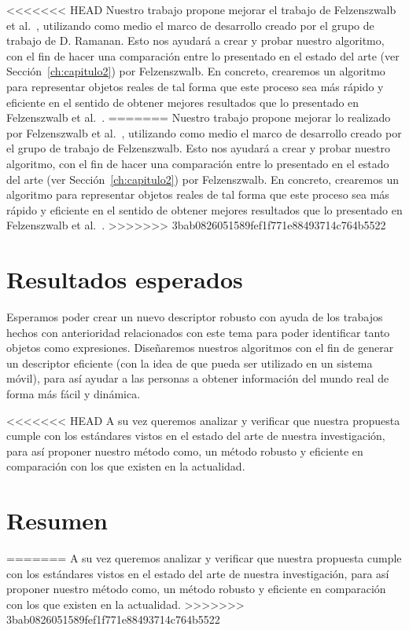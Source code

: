 <<<<<<< HEAD
Nuestro trabajo propone mejorar el trabajo de Felzenszwalb et al.~\cite{Felzenszwalb2010}, utilizando como medio el marco de desarrollo creado por el grupo de trabajo de D. Ramanan. Esto nos ayudará a crear y probar nuestro algoritmo, con el fin de hacer una comparación entre lo presentado en el estado del arte (ver Sección~\ref{ch:capitulo2}) por Felzenszwalb. En concreto, crearemos un algoritmo para representar objetos reales de tal forma que este proceso sea más rápido y eficiente en el sentido de obtener mejores resultados que lo presentado en Felzenszwalb et al.~\cite{Felzenszwalb2010}.
=======
Nuestro trabajo propone mejorar lo realizado por Felzenszwalb et al.~\cite{Felzenszwalb2010}, utilizando como medio el marco de desarrollo creado por el grupo de trabajo de Felzenszwalb. Esto nos ayudará a crear y probar nuestro algoritmo, con el fin de hacer una comparación entre lo presentado en el estado del arte (ver Sección~\ref{ch:capitulo2}) por Felzenszwalb. En concreto, crearemos un algoritmo para representar objetos reales de tal forma que este proceso sea más rápido y eficiente en el sentido de obtener mejores resultados que lo presentado en Felzenszwalb et al.~\cite{Felzenszwalb2010}.
>>>>>>> 3bab0826051589fef1f771e88493714c764b5522

\section{Resultados esperados}
Esperamos poder crear un nuevo descriptor robusto con ayuda de los trabajos hechos con anterioridad relacionados con este tema para poder identificar tanto objetos como expresiones. Diseñaremos nuestros algoritmos con el fin de generar un descriptor eficiente (con la idea de que pueda ser utilizado en un sistema móvil), para así ayudar a las personas a obtener información del mundo real de forma más fácil y dinámica.

<<<<<<< HEAD
A su vez queremos analizar y verificar que nuestra propuesta cumple con los estándares vistos en el estado del arte de nuestra investigación, para así proponer nuestro método como, un método robusto y eficiente en comparación con los que existen en la actualidad.

\section{Resumen}

=======
A su vez queremos analizar y verificar que nuestra propuesta cumple con los estándares vistos en el estado del arte de nuestra investigación, para así proponer nuestro método como, un método robusto y eficiente en comparación con los que existen en la actualidad.
>>>>>>> 3bab0826051589fef1f771e88493714c764b5522
